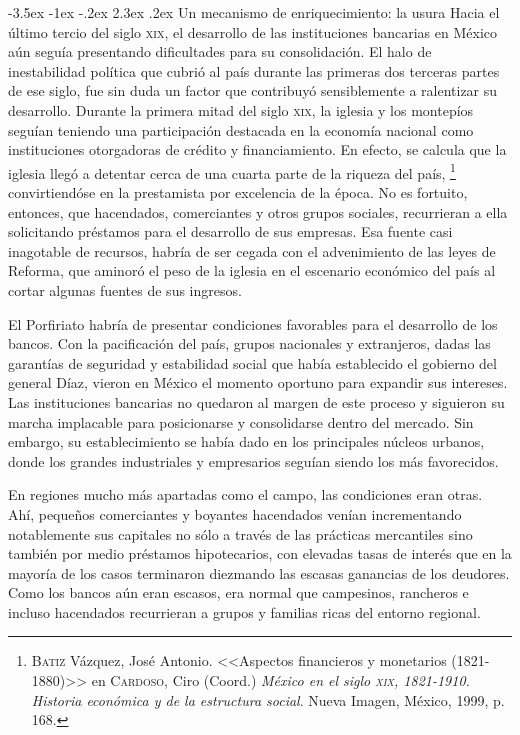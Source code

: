 \documentclass[14pt,twoside,final]{extbook} %
\makeatletter
\let\oldfootnote\footnote
\renewcommand\footnote[1]{%
\oldfootnote{\hspace{1mm}#1}}
\renewcommand\section{\@startsection {section}{1}{\z@}%
                                     {-3.5ex \@plus -1ex \@minus -.2ex}%
                                     {2.3ex \@plus .2ex}%
                                     {\normalfont\large\bfseries\sc}}
\makeatother
\begin{document}
\section{Un mecanismo de enriquecimiento: la usura}\label{sec:usura}
Hacia el último tercio del siglo \textsc{xix}, el desarrollo de las instituciones bancarias en México aún seguía presentando dificultades para su consolidación. El halo de inestabilidad política que cubrió al país durante las primeras dos terceras partes de ese siglo, fue sin duda un factor que
contribuyó sensiblemente a ralentizar su desarrollo. Durante la primera mitad del siglo \textsc{xix}, la iglesia y los montepíos seguían teniendo una participación destacada en la economía nacional como instituciones otorgadoras de crédito y financiamiento. En efecto, se calcula que la iglesia llegó a detentar cerca de una cuarta parte de la riqueza del país,\footnote{\textsc{Batiz} Vázquez, José Antonio. <<Aspectos financieros y monetarios (1821-1880)>> en \textsc{Cardoso}, Ciro (Coord.) \emph{México en el siglo \textsc{xix}, 1821-1910. Historia económica y de la estructura social}. Nueva Imagen, México, 1999, p. 168.} convirtiendóse en la prestamista por excelencia de la época. No es fortuito, entonces, que hacendados, comerciantes y otros grupos sociales, recurrieran a ella solicitando préstamos para el desarrollo de sus empresas. Esa fuente casi inagotable de recursos, habría de ser cegada con el advenimiento de las leyes de Reforma, que aminoró el peso de la iglesia en el escenario económico del país al cortar algunas fuentes de sus ingresos.

El Porfiriato habría de presentar condiciones favorables para el desarrollo de los bancos. Con la pacificación del país, grupos nacionales y extranjeros, dadas las garantías de seguridad y estabilidad social que había establecido el gobierno del general Díaz, vieron en México el momento oportuno para expandir sus intereses. Las instituciones bancarias no quedaron al margen de este proceso y siguieron su marcha implacable para posicionarse y consolidarse dentro del mercado. Sin embargo, su establecimiento se había dado en los principales núcleos urbanos, donde los grandes industriales y empresarios seguían siendo los más favorecidos.

En regiones mucho más apartadas como el campo, las condiciones eran otras. Ahí, pequeños comerciantes y boyantes hacendados venían incrementando notablemente sus capitales no sólo a través de las prácticas mercantiles sino también por medio préstamos hipotecarios, con elevadas tasas de interés que en la mayoría de los casos terminaron diezmando las escasas ganancias de los deudores. Como los
bancos aún eran escasos, era normal que campesinos, rancheros e incluso hacendados recurrieran a grupos y familias ricas del entorno regional.
\end{document}

